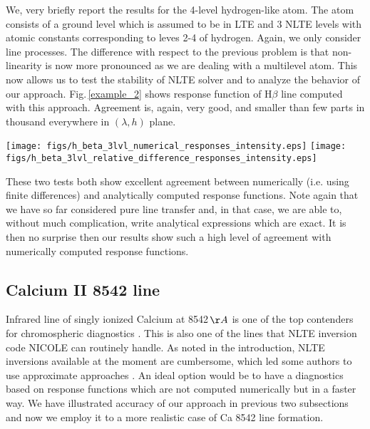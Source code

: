 \documentclass[referee]{aa}
\begin{document}
We, very briefly report the results for the 4-level hydrogen-like atom. The atom consists of a ground level which is assumed to be in LTE and 3 NLTE levels with atomic constants corresponding to leves 2-4 of hydrogen. Again, we only consider line processes. The difference with respect to the previous problem is that non-linearity is now more pronounced as we are dealing with a multilevel atom. This now allows us to test the stability of NLTE solver and to analyze the behavior of our approach. Fig.\,\ref{example_2} shows response function of H$\beta$ line computed with this approach. Agreement is, again, very good, and smaller than few parts in thousand everywhere in $(\lambda,h)$ plane.  

\begin{figure*}
 \texttt{[image: figs/h\_beta\_3lvl\_numerical\_responses\_intensity.eps]}
 \texttt{[image: figs/h\_beta\_3lvl\_relative\_difference\_responses\_intensity.eps]}
 \caption{Analytical response function (left) for emergent intensity for H$\beta$ line and the relative difference between the analytical and numerical approach, normalized with respect to the maximum response, for the 4-level hydrogen atom (log scale).}
 \label{example_2}
\end{figure*}

These two tests both show excellent agreement between numerically (i.e. using finite differences) and analytically computed response functions. Note again that we have so far considered pure line transfer and, in that case, we are able to, without much complication, write analytical expressions which are exact. It is then no surprise then our results show such a high level of agreement with numerically computed response functions. 


\subsection{Calcium II 8542 line}

Infrared line of singly ionized Calcium at 8542\,$\AA$ is one of the top contenders for chromospheric diagnostics \citep[see][for an in depth discussion of response function and diagnostic capabilities]{Ca_diag_Jaime}. This is also one of the lines that NLTE inversion code NICOLE can routinely handle. As noted in the introduction, NLTE inversions available at the moment are cumbersome, which led some authors to use approximate approaches \citep{Beck_inversion_2015}. An ideal option would be to have a diagnostics based on response functions which are not computed numerically but in a faster way. We have illustrated accuracy of our approach in previous two subsections and now we employ it to a more realistic case of Ca 8542 line formation. 
\end{document}
